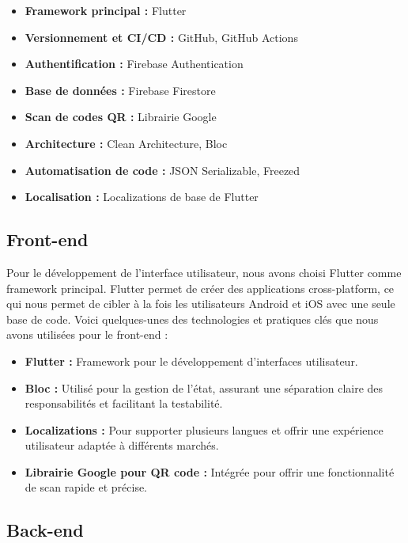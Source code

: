 \begin{itemize}[noitemsep]
    \item \textbf{Framework principal :} Flutter
    \item \textbf{Versionnement et CI/CD :} GitHub, GitHub Actions
    \item \textbf{Authentification :} Firebase Authentication
    \item \textbf{Base de données :} Firebase Firestore
    \item \textbf{Scan de codes QR :} Librairie Google
    \item \textbf{Architecture :} Clean Architecture, Bloc
    \item \textbf{Automatisation de code :} JSON Serializable, Freezed
    \item \textbf{Localisation :} Localizations de base de Flutter
\end{itemize}

\subsection{Front-end}

Pour le développement de l'interface utilisateur, nous avons choisi Flutter comme framework principal. Flutter permet de créer des applications cross-platform, ce qui nous permet de cibler à la fois les utilisateurs Android et iOS avec une seule base de code. Voici quelques-unes des technologies et pratiques clés que nous avons utilisées pour le front-end :

\begin{itemize}[noitemsep]
    \item \textbf{Flutter :} Framework pour le développement d'interfaces utilisateur.
    \item \textbf{Bloc :} Utilisé pour la gestion de l'état, assurant une séparation claire des responsabilités et facilitant la testabilité.
    \item \textbf{Localizations :} Pour supporter plusieurs langues et offrir une expérience utilisateur adaptée à différents marchés.
    \item \textbf{Librairie Google pour QR code :} Intégrée pour offrir une fonctionnalité de scan rapide et précise.
\end{itemize}

\subsection{Back-end}

